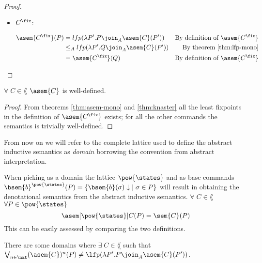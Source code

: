 \begin{proof}
\begin{itemize}
    \item $C^\fix$:

      \begin{align*}
        \asem{C^\fix}(P) 
          &= lfp(\lambda P'. P \join_A \asem{C}(P'))
          &\text{By definition of $\asem{C^\fix}$}\\
          &\leq_A lfp(\lambda P'. Q \join_A \asem{C}(P'))
          &\text{By theorem \ref{thm:lfp-mono}}\\
          &= \asem{C^\fix}(Q) 
          &\text{By definition of $\asem{C^\fix}$}\\
      \end{align*}

  \end{itemize}

\end{proof}


\begin{lemma}
  $\forall \; C \in \lang$ $\asem{C}$ is well-defined.
\end{lemma}
\begin{proof}
  From theorems \ref{thm:asem-mono} and 
  \ref{thm:knaster} all the least fixpoints in the definition of 
  $\asem{C^\fix}$ exists; for all the other commands the semantics is 
  trivially well-defined.
\end{proof}

From now on we will refer to the complete lattice used to define the abstract
inductive semantics as \textit{domain} borrowing the convention from abstract
interpretation.

\begin{observation}
  \label{obs:post}
  When picking as a domain the lattice $\pow{\states}$ and as base commands
  $\bsem{b}^{\pow{\states}}(P) = \{ \bsem{b}(\sigma)\downarrow \; \mid \sigma 
  \in P \}$ will result in obtaining the denotational semantics from the 
  abstract inductive semantics. $\forall \; C \in \lang$ $\forall P \in 
  \pow{\states}$ 
  $$\asem[\pow{\states}]{C}(P) = \sem{C}(P)$$
  This can be easily assessed by comparing the two definitions.
\end{observation}

\begin{observation}
  \label{obs:abstract-fix}
  There are some domains where $\exists \; C \in \lang$ such that
  $\bigvee_{n \in \nat} (\asem{C})^n(P) \neq \lfp(\lambda P'. P \join_A
  \asem{C}(P'))$.
\end{observation}

